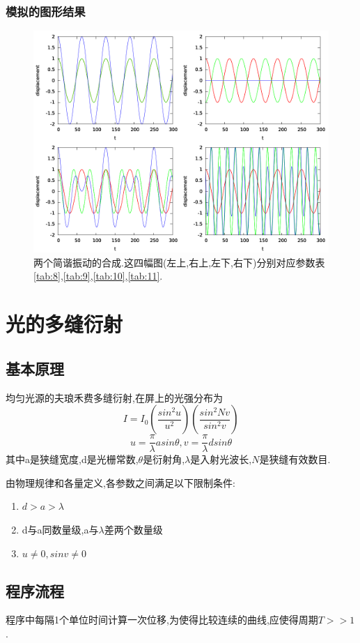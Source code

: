 \documentclass[10pt,a4paper]{article}
\begin{document}
\subsubsection{模拟的图形结果}
\begin{figure}[H]
\centering
\includegraphics[width=\textwidth]{../result/simulation1.png}
\caption{两个简谐振动的合成.这四幅图(左上,右上,左下,右下)分别对应参数表\ref{tab:8},\ref{tab:9},\ref{tab:10},\ref{tab:11}.}
\end{figure}

\section{光的多缝衍射}
\subsection{基本原理}
均匀光源的夫琅禾费多缝衍射,在屏上的光强分布为
$$I = I_0(\frac{sin^2u}{u^2})(\frac{sin^2Nv}{sin^2v})$$
$$u = \frac{\pi}{\lambda}a sin\theta,v = \frac{\pi}{\lambda}d sin\theta$$
其中a是狭缝宽度,d是光栅常数,$\theta$是衍射角,$\lambda$是入射光波长,$N$是狭缝有效数目.

由物理规律和各量定义,各参数之间满足以下限制条件:
\begin{enumerate}
\item $d>a>\lambda$
\item d与a同数量级,a与$\lambda$差两个数量级
\item $u\neq 0, sinv\neq 0$
\end{enumerate}

\subsection{程序流程}
程序中每隔1个单位时间计算一次位移,为使得比较连续的曲线,应使得周期$T>>1$.
\end{document}
